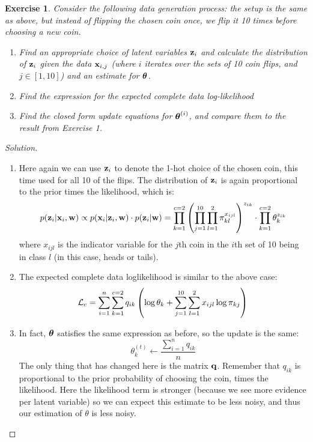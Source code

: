 \documentclass[12pt,letterpaper]{article}
\newtheorem{exercise}{Exercise}
\newenvironment{exercisesolution}
  {\begin{proof}[Solution]}
  {\end{proof}}
\begin{document}
\begin{exercise}
Consider the following data generation process: the setup is the same as above, but instead of flipping the chosen coin once, we flip it 10 times before choosing a new coin.

\begin{enumerate}
    \item Find an appropriate choice of latent variables $\mathbf{z}_i$ and calculate the distribution of $\mathbf{z}_i$ given the data $\mathbf{x}_{i,j}$ (where $i$ iterates over the sets of 10 coin flips, and $j \in [1, 10]$) and an estimate for $\boldsymbol{\theta}$.
    \item Find the expression for the expected complete data log-likelihood
    \item Find the closed form update equations for $\boldsymbol{\theta}^{(i)}$, and compare them to the result from Exercise 1.
\end{enumerate}
\end{exercise}
\begin{exercisesolution}
\noindent
\begin{enumerate}
	\item Here again we can use $\mathbf{z}_i$ to denote the 1-hot choice of the chosen coin, this time used for all 10 of the flips. The distribution of $\mathbf{z}_i$ is again proportional to the prior times the likelihood, which is:
	$$p(\mathbf{z}_i | \mathbf{x}_i, \mathbf{w}) \propto p(\mathbf{x}_i | \mathbf{z}_i, \mathbf{w}) \cdot p(\mathbf{z}_i | \mathbf{w}) = \prod_{k = 1}^{c = 2}\left(\prod_{j = 1}^{10}\prod_{l = 1}^{2}\pi_{kl}^{x_{ijl}}\right)^{z_{ik}} \cdot \prod_{k = 1}^{c = 2}\theta_k^{z_{ik}}$$
	where $x_{ijl}$ is the indicator variable for the $j$th coin in the $i$th set of 10 being in class $l$ (in this case, heads or tails).
	\item The expected complete data loglikelihood is similar to the above case:
	$$\mathcal{L}_c = \sum_{i = 1}^n \sum_{k = 1}^{c = 2} q_{ik}\left(\log \theta_k + \sum_{j = 1}^{10}\sum_{l = 1}^2 x_{ijl} \log \pi_{kj}\right)$$
	\item In fact, $\boldsymbol{\theta}$ satisfies the same expression as before, so the update is the same:
	$$\theta^{(t)}_k \leftarrow \frac{\sum_{i = 1}^n q_{ik}}{n}$$
	The only thing that has changed here is the matrix $\mathbf{q}$. Remember that $q_{ik}$ is proportional to the prior probability of choosing the coin, times the likelihood. Here the likelihood term is stronger (because we see more evidence per latent variable) so we can expect this estimate to be less noisy, and thus our estimation of $\theta$ is less noisy.
\end{enumerate}
\smallskip

\end{exercisesolution}
\end{document}
